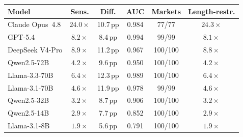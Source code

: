 \begin{tabular}{lccccc}
\toprule
\textbf{Model} & \textbf{Sens.} & \textbf{Diff.} & \textbf{AUC} & \textbf{Markets} & \textbf{Length-restr.} \\
\midrule
Claude Opus~4.8  & $24.0\times$ & 10.7\,pp & 0.984 & 77/77 & $24.3\times$ \\
GPT-5.4          & $8.2\times$ & 8.4\,pp & 0.994 & 99/99 & $8.1\times$ \\
DeepSeek V4-Pro  & $8.9\times$ & 11.2\,pp & 0.967 & 100/100 & $8.8\times$ \\
\midrule
Qwen2.5-72B     & $4.2\times$ & 9.6\,pp & 0.950 & 100/100 & $4.2\times$ \\
Llama-3.3-70B    & $6.4\times$ & 12.3\,pp & 0.989 & 100/100 & $6.4\times$ \\
Llama-3.1-70B    & $4.6\times$ & 11.9\,pp & 0.978 & 99/99 & $4.6\times$ \\
Qwen2.5-32B     & $3.2\times$ & 8.7\,pp & 0.906 & 100/100 & $3.2\times$ \\
Qwen2.5-14B     & $2.9\times$ & 7.7\,pp & 0.852 & 100/100 & $2.9\times$ \\
Llama-3.1-8B     & $1.9\times$ & 5.6\,pp & 0.791 & 100/100 & $1.9\times$ \\
\bottomrule
\end{tabular}
